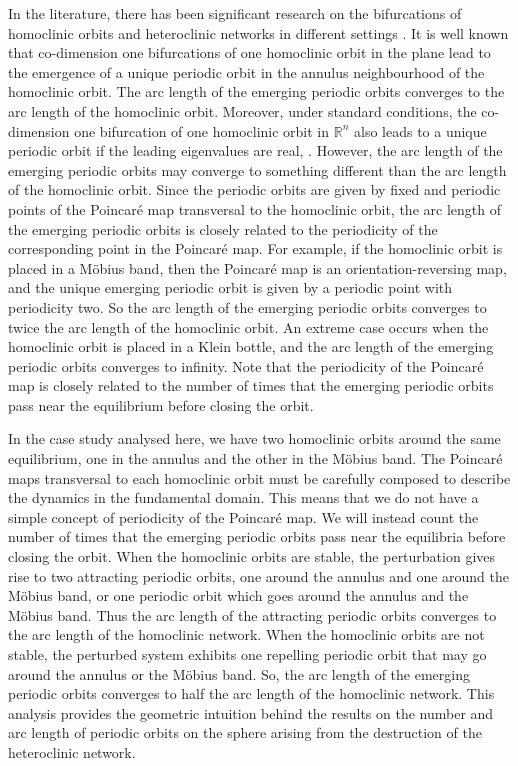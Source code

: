 \documentclass{article}
\theoremstyle{definition}
\begin{document}
In the literature, there has been significant research on the bifurcations of homoclinic orbits and heteroclinic networks in different settings \cite{HS10}. 
It is well known that co-dimension one bifurcations of one homoclinic orbit in the plane lead to the emergence of a unique periodic orbit in the annulus neighbourhood of the homoclinic orbit.
The arc length of the emerging periodic orbits converges to the arc length of the homoclinic orbit.
Moreover, under standard conditions, the co-dimension one bifurcation of one homoclinic orbit in $\mathbb{R}^n$ also leads to a unique periodic orbit if the leading eigenvalues are real, \cite{S68}.
However, the arc length of the emerging periodic orbits may converge to something different than the arc length of the homoclinic orbit.
Since the periodic orbits are given by fixed and periodic points of the Poincaré map transversal to the homoclinic orbit, the arc length of the emerging periodic orbits is closely related to the periodicity of the corresponding point in the Poincaré map.
For example, if the homoclinic orbit is placed in a Möbius band, then the Poincaré map is an orientation-reversing map, and the unique emerging periodic orbit is given by a periodic point with periodicity two.
So the arc length of the emerging periodic orbits converges to twice the arc length of the homoclinic orbit. 
An extreme case occurs when the homoclinic orbit is placed in a Klein bottle, and the arc length of the emerging periodic orbits converges to infinity.
Note that the periodicity of the Poincaré map is closely related to the number of times that the emerging periodic orbits pass near the equilibrium before closing the orbit. 

In the case study analysed here, we have two homoclinic orbits around the same equilibrium, one in the annulus and the other in the Möbius band.
The Poincaré maps transversal to each homoclinic orbit must be carefully composed to describe the dynamics in the fundamental domain.
This means that we do not have a simple concept of periodicity of the Poincaré map.
We will instead count the number of times that the emerging periodic orbits pass near the equilibria before closing the orbit.  
When the homoclinic orbits are stable, the perturbation gives rise to two attracting periodic orbits, one around the annulus and one around the Möbius band, or one periodic orbit which goes around the annulus and the Möbius band.
Thus the arc length of the attracting periodic orbits converges to the arc length of the homoclinic network.
When the homoclinic orbits are not stable, the perturbed system exhibits one repelling periodic orbit that may go around the annulus or the Möbius band. 
So, the arc length of the emerging periodic orbits converges to half the arc length of the homoclinic network.
This analysis provides the geometric intuition behind the results on the number and arc length of periodic orbits on the sphere arising from the destruction of the heteroclinic network.
\end{document}
